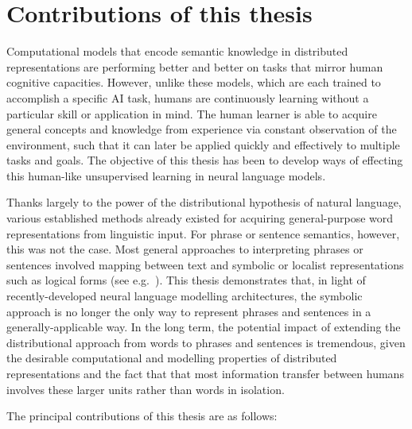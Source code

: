 
\section{Contributions of this thesis}

Computational models that encode semantic knowledge in distributed representations are performing better and better on tasks that mirror human cognitive capacities. However, unlike these models, which are each trained to accomplish a specific AI task, humans are continuously learning without a particular skill or application in mind. The human learner is able to acquire general concepts and knowledge from experience via constant observation of the environment, such that it can later be applied quickly and effectively to multiple tasks and goals. The objective of this thesis has been to develop ways of effecting this human-like unsupervised learning in neural language models.

Thanks largely to the power of the distributional hypothesis of natural language, various established methods already existed for acquiring general-purpose word representations from linguistic input. For phrase or sentence semantics, however, this was not the case. Most general approaches to interpreting phrases or sentences involved mapping between text and symbolic or localist representations such as logical forms (see e.g.~\citealt{poon2009unsupervised}). This thesis demonstrates that, in light of recently-developed neural language modelling architectures, the symbolic approach is no longer the only way to represent phrases and sentences in a generally-applicable way. In the long term, the potential impact of extending the distributional approach from words to phrases and sentences is tremendous, given the desirable computational and modelling properties of distributed representations and the fact that that most information transfer between humans involves these larger units rather than words in isolation. 

The principal contributions of this thesis are as follows:

